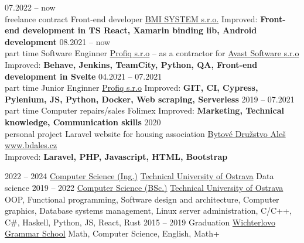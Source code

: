 \documentclass[9pt]{developercv} %
\begin{document}
\begin{entrylist}
    \entry
		{07.2022 -- now\\\footnotesize{freelance contract}}
		{Front-end developer}
		{\href{http://www.bmisystem.cz/}{BMI SYSTEM s.r.o.}}
		{Improved: \textbf{Front-end development in TS React, Xamarin binding lib, Android development}}
	\entry
		{08.2021 -- now\\\footnotesize{part time}}
		{Software Enginner}
		{\href{https://www.profiq.com/}{Profiq s.r.o} -- as a contractor for \href{https://www.avast.com/index}{Avast Software s.r.o}}
		{Improved: \textbf{Behave, Jenkins, TeamCity, Python, QA, Front-end development in Svelte}}
	\entry
		{04.2021 -- 07.2021\\\footnotesize{part time}}
		{Junior Enginner}
		{\href{https://www.profiq.com/}{\href{https://www.folimex.cz/}{Profiq s.r.o}}}
		{Improved: \textbf{GIT, CI, Cypress, Pylenium, JS, Python, Docker, Web scraping, Serverless}}
	\entry
		{2019 -- 07.2021\\\footnotesize{part time}}
		{Computer repairs/sales}
		{Folimex}
		{Improved: \textbf{Marketing, Technical knowledge, Communication skills}}
	\entry
		{2020\\\footnotesize{personal project}}
		{Laravel website for housing association}
		{\href{www.bdales.cz}{Bytové Družstvo Aleš}}
		{\href{www.bdales.cz}{www.bdales.cz}\\Improved: \textbf{Laravel, PHP, Javascript, HTML, Bootstrap}}
\end{entrylist}


\begin{entrylist}
	\entry
		{2022 -- 2024}
		{\href{https://www.vsb.cz/en/ects/fei/?programmeId=1103&academicYearId=62}{Computer Science (Ing.)}}
		{\href{https://www.fei.vsb.cz/en/}{Technical University of Ostrava}}
		{Data science}
	\entry
		{2019 -- 2022}
		{\href{https://www.vsb.cz/en/ects/fei/?programmeId=771&academicYearId=62}{Computer Science (BSc.)}}
		{\href{https://www.fei.vsb.cz/en/}{Technical University of Ostrava}}
		{OOP, Functional programming, Software design and architecture, Computer graphics, Database systems management, Linux server administration, C/C++, C\#, Haskell, Python, JS, React, Rust}
	\entry
		{2015 -- 2019}
		{Graduation}
		{\href{www.wigym.cz/}{Wichterlovo Grammar School}}
		{Math, Computer Science, English, Math+}
\end{entrylist}
\end{document}
